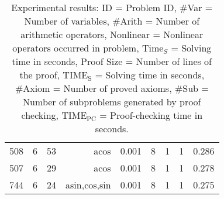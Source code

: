 \begin{table}
\begin{center}
\begin{tabular}{l|r|r|r|r|r|r|r|r}
508 & 6 & 53 & acos & 0.001 & 8 & 1 & 1 & 0.286 \\
507 & 6 & 29 & acos & 0.001 & 8 & 1 & 1 & 0.278 \\
744 & 6 & 24 & asin,cos,sin & 0.001 & 8 & 1 & 1 & 0.275
\end{tabular}
  \end{center}
  \caption{
    Experimental results:
    ID = Problem ID,
    \#Var = Number of variables,
    \#Arith = Number of arithmetic operators,
    Nonlinear = Nonlinear operators occurred in problem,
    Time$_S$ = Solving time in seconds,
    Proof Size = Number of lines of the proof,
    $\mathrm{TIME_S}$ = Solving time in seconds,
    \#Axiom = Number of proved axioms,
    \#Sub = Number of subproblems generated by proof checking,
    $\mathrm{TIME_{PC}}$ = Proof-checking time in seconds.
  }\label{tbl:exp}
\end{table}

